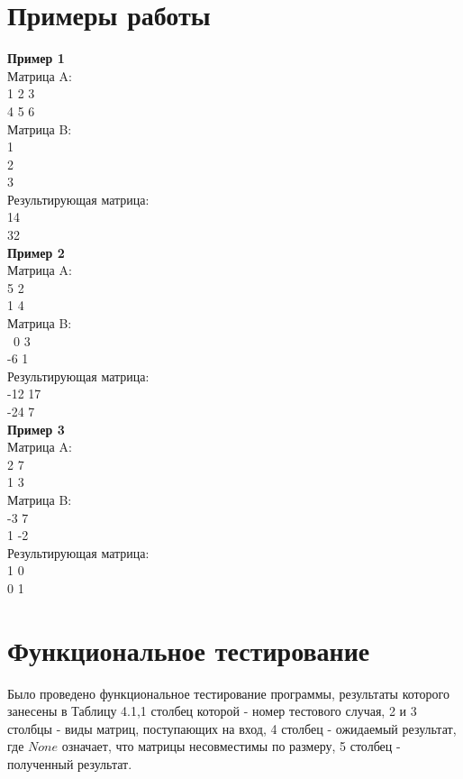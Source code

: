 \documentclass[a4paper,12pt]{report}
\begin{document}
\section{Примеры работы}
\hspace{0.6cm}\textbf {Пример 1}\\
Матрица A:\\
1 2 3\\
4 5 6\\
Матрица B:\\
1\\
2\\
3\\
Результирующая матрица:\\
14\\
32\\

\textbf {Пример 2}\\
Матрица A:\\
5 2\\
1 4\\
Матрица B:\\\
0 3\\
-6 1\\
Результирующая матрица:\\
-12 17\\
-24 7\\

\newpage 
\textbf {Пример 3}\\
Матрица A:\\
2 7\\
1 3\\
Матрица B:\\
-3 7\\
1 -2\\
Результирующая матрица:\\
1 0\\
0 1\\

\section{Функциональное тестирование}
\hspace{0.6cm}Было проведено функциональное тестирование программы, результаты которого занесены в Таблицу 4.1,1 столбец которой - номер тестового случая, 2 и 3 столбцы - виды матриц, поступающих на вход, 4 столбец - ожидаемый результат, где $None$ означает, что матрицы несовместимы по размеру, 5 столбец - полученный результат. \\
\end{document}

